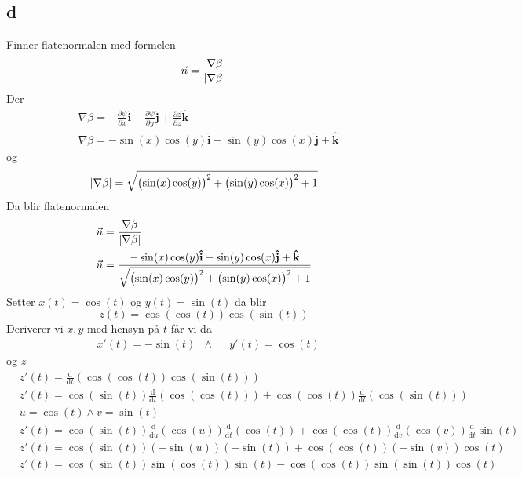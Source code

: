 \documentclass[a4paper,10pt,norsk]{article}
\newcommand{\dd}[1]{\mathrm{d}#1}
\newcommand{\uvec}[1]{\boldsymbol{\hat{\textbf{#1}}}}
\begin{document}
	\subsection*{d}
	Finner flatenormalen med formelen \[
	\vec{n} = \frac{\nabla\beta}{\abs{\nabla \beta}}
	\] 
	Der
	\begin{align*}
		&\nabla \beta = - \frac{\partial \psi}{\partial x} \uvec{i} - \frac{\partial \psi}{\partial y} \uvec{j} + \frac{\partial z}{\partial z} \uvec{k}\\
		&\nabla \beta = - \sin(x) \cos(y) \uvec{i} - \sin(y) \cos(x) \uvec{j} + \uvec{k}
	\end{align*}
	og
	\begin{align*}
		\abs{\nabla \beta} = \sqrt{\left( \sin(x) \cos(y)  \right) ^2 + \left( \sin(y) \cos(x)  \right) ^2 +1}
	\end{align*}
	Da blir flatenormalen
	\begin{align*}
		&\vec{n} = \frac{\nabla \beta}{\abs{\nabla \beta}}\\
		&\vec{n} = \frac{- \sin(x) \cos(y) \uvec{i} - \sin(y) \cos(x) \uvec{j} + \uvec{k}}{\sqrt{\left( \sin(x) \cos(y)  \right) ^2 + \left( \sin(y) \cos(x)  \right) ^2 +1}}
	\end{align*}
	Setter $x(t) = \cos(t) $ og $y(t)=\sin(t) $ da blir \[
		z(t) = \cos(\cos(t) ) \cos(\sin(t) ) 
	\] 
	Deriverer vi $x,y$ med hensyn på $t$ får vi da
	\begin{align*}
		&x'(t)	= - \sin(t) &\wedge & &y'(t) = \cos(t) 
	\end{align*}
	og $z$
	 \begin{align*}
		 &z'(t) = \frac{\dd{}}{\dd{t}} \left( \cos(\cos(t) ) \cos(\sin(t) )  \right) \\
		 &z'(t) = \cos(\sin(t) ) \frac{\dd{}}{\dd{t}}\left ( \cos(\cos(t) )\right) + \cos(\cos(t) ) \frac{\dd{}}{\dd{t}}\left ( \cos(\sin(t) )\right) \\
		 &\boxed{u = \cos(t) \wedge v = \sin(t) }\\
		 &z'(t) = \cos(\sin(t) ) \frac{\dd{}}{\dd{u}}\left( \cos(u)  \right) \frac{\dd{}}{\dd{t}}\left( \cos(t)  \right) + \cos(\cos(t) ) \frac{\dd{}}{\dd{v}} \left( \cos(v)  \right) \frac{\dd{}}{\dd{t}} \sin(t) \\
		 &z'(t) = \cos(\sin(t) ) \left( - \sin(u)  \right) \left( -\sin(t)  \right) + \cos(\cos(t) ) \left( - \sin(v)  \right) \cos(t)  \\
		 &z'(t) = \cos(\sin(t) ) \sin(\cos(t) ) \sin(t)  - \cos(\cos(t)) \sin(\sin(t) ) \cos(t) 
	\end{align*}
\end{document}
